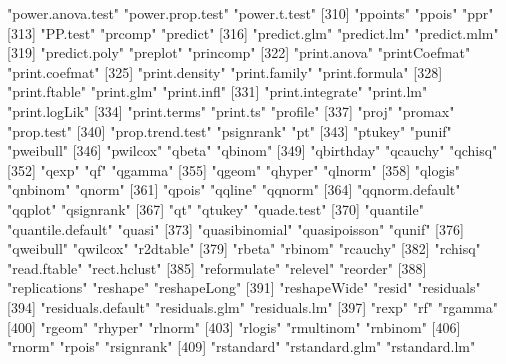 \begin{Schunk}
\begin{Soutput}
[307] "power.anova.test"     "power.prop.test"      "power.t.test"        
[310] "ppoints"              "ppois"                "ppr"                 
[313] "PP.test"              "prcomp"               "predict"             
[316] "predict.glm"          "predict.lm"           "predict.mlm"         
[319] "predict.poly"         "preplot"              "princomp"            
[322] "print.anova"          "printCoefmat"         "print.coefmat"       
[325] "print.density"        "print.family"         "print.formula"       
[328] "print.ftable"         "print.glm"            "print.infl"          
[331] "print.integrate"      "print.lm"             "print.logLik"        
[334] "print.terms"          "print.ts"             "profile"             
[337] "proj"                 "promax"               "prop.test"           
[340] "prop.trend.test"      "psignrank"            "pt"                  
[343] "ptukey"               "punif"                "pweibull"            
[346] "pwilcox"              "qbeta"                "qbinom"              
[349] "qbirthday"            "qcauchy"              "qchisq"              
[352] "qexp"                 "qf"                   "qgamma"              
[355] "qgeom"                "qhyper"               "qlnorm"              
[358] "qlogis"               "qnbinom"              "qnorm"               
[361] "qpois"                "qqline"               "qqnorm"              
[364] "qqnorm.default"       "qqplot"               "qsignrank"           
[367] "qt"                   "qtukey"               "quade.test"          
[370] "quantile"             "quantile.default"     "quasi"               
[373] "quasibinomial"        "quasipoisson"         "qunif"               
[376] "qweibull"             "qwilcox"              "r2dtable"            
[379] "rbeta"                "rbinom"               "rcauchy"             
[382] "rchisq"               "read.ftable"          "rect.hclust"         
[385] "reformulate"          "relevel"              "reorder"             
[388] "replications"         "reshape"              "reshapeLong"         
[391] "reshapeWide"          "resid"                "residuals"           
[394] "residuals.default"    "residuals.glm"        "residuals.lm"        
[397] "rexp"                 "rf"                   "rgamma"              
[400] "rgeom"                "rhyper"               "rlnorm"              
[403] "rlogis"               "rmultinom"            "rnbinom"             
[406] "rnorm"                "rpois"                "rsignrank"           
[409] "rstandard"            "rstandard.glm"        "rstandard.lm"        

\end{Soutput}
\end{Schunk}
